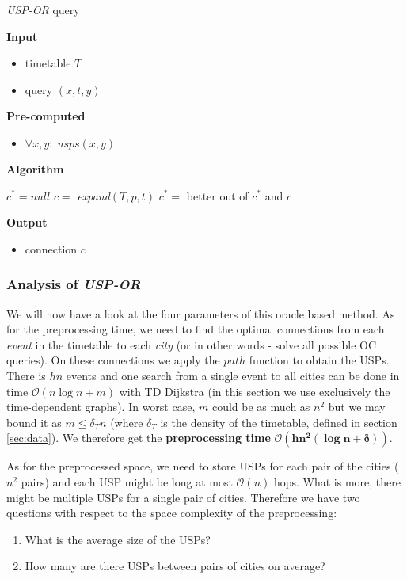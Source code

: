 	\color{algcolor}
	\begin{algorithm}[H]
		\color{inalgcolor}
		\caption{\textit{USP-OR} query}
		\label{alg:uspor-query}
		\textbf{Input} 
		\begin{itemize}
			\item timetable $T$
			\item query $(x, t, y)$
		\end{itemize}
		\textbf{Pre-computed} 
		\begin{itemize}
			\item $\forall x, y: \; usps(x, y)$
		\end{itemize}
		\textbf{Algorithm}
		\begin{algorithmic}
			\STATE $c^{*} = null$
				\STATE $c =$ \textit{expand}$(T, p, t)$
				\STATE $c^{*} =$ better out of $c^{*}$ and $c$
			\ENDFOR
		\end{algorithmic}
		\textbf{Output}
		\begin{itemize}
			\item connection $c$
		\end{itemize}
	\end{algorithm}
	\color{black}	
	
	\subsubsection{Analysis of \textit{USP-OR}}	
	
		\noindent We will now have a look at the four parameters of this oracle based method. As for the preprocessing time, we need to find the optimal connections from each \textit{event} in the timetable to each \textit{city} (or in other words - solve all possible OC queries). On these connections we apply the $path$ function to obtain the USPs. There is $hn$ events and one search from a single event to all cities can be done in time $\mathcal{O}(n \log n + m)$ with TD Dijkstra (in this section we use exclusively the time-dependent graphs). In worst case, $m$ could be as much as $n^{2}$ but we may bound it as $m \leq \delta_{T} n$ (where $\delta_{T}$ is the density of the timetable, defined in section \ref{sec:data}). We therefore get the \textbf{preprocessing time} $\bm{\mathcal{O}(hn^{2} (\log n + \delta))}$. 
		
		As for the preprocessed space, we need to store USPs for each pair of the cities ($n^{2}$ pairs) and each USP might be long at most $\mathcal{O}(n)$ hops. What is more, there might be multiple USPs for a single pair of cities. Therefore we have two questions with respect to the space complexity of the preprocessing:
		\begin{enumerate}
			\item What is the average size of the USPs?
			\item How many are there USPs between pairs of cities on average?
		\end{enumerate}
		\hspace*{\fill}
		
